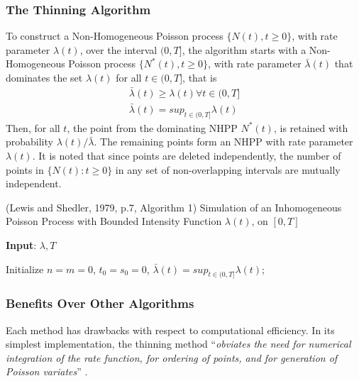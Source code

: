 \documentclass[%
 reprint,
 amsmath,amssymb,
 aps,
]{revtex4-2}
\theoremstyle{definition}
\begin{document}
\subsubsection{The Thinning Algorithm}
To construct a Non-Homogeneous Poisson process $\{N(t) , t \ge 0 \}$, with rate parameter $\lambda(t)$, over the interval $(0,T]$, the algorithm starts with a Non-Homogeneous Poisson process $\{N^{*}(t) , t \ge 0 \}$, with rate parameter $\bar{\lambda}(t)$ that dominates the set $\lambda(t)$ for all $t \in (0,T]$, that is 
\begin{gather*}
\bar{\lambda}(t) \ge \lambda(t) \forall t \in (0,T]\\
\bar{\lambda}(t) = sup_{t\in(0,T]}\lambda(t)
\end{gather*}
Then, for all $t$, the point from the dominating NHPP $N^{*}(t)$, is retained with probability $\lambda(t)/\bar{\lambda}$. The remaining points form an NHPP with rate parameter $\lambda(t)$. It is noted that since points are deleted independently, the number of points in $\{N(t) : t \ge 0\}$ in any set of non-overlapping intervals are mutually independent.

\begin{algorithm}
\label{alg:1}
\caption{(Lewis and Shedler, 1979, p.7, Algorithm 1) Simulation of an Inhomogeneous Poisson Process with Bounded Intensity Function $\lambda(t)$, on $[0, T]$}
\textbf{Input}: $\lambda,T$

Initialize $n = m = 0$, $t_0 = s_0 = 0$, $\bar{\lambda}(t) = sup_{t\in(0,T]}\lambda(t)$;

\end{algorithm}

\subsubsection{Benefits Over Other Algorithms}
Each method has drawbacks with respect to computational efficiency. In its simplest implementation, the thinning method ``\textit{obviates the need for numerical integration of the rate function, for ordering of points, and for generation of Poisson variates}'' \cite{lewis_shedler_1979}. 
\end{document}
